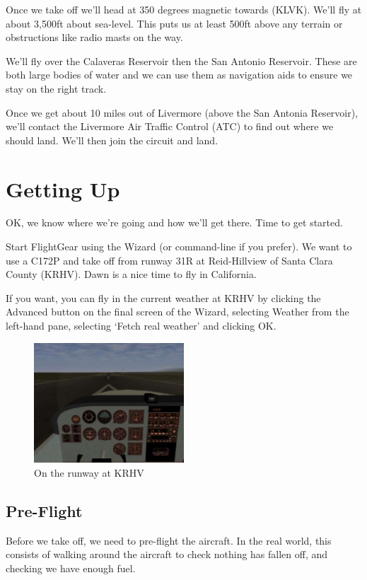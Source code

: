 Once we take off we'll head at 350 degrees magnetic towards  (KLVK).
We'll fly at about 3,500ft about sea-level. This puts us at least 500ft above any
terrain or obstructions like radio masts on the way.

We'll fly over the Calaveras Reservoir then the San Antonio Reservoir. These are
both large bodies of water and we can use them as navigation aids to ensure we
stay on the right track.

Once we get about 10 miles out of Livermore (above the San Antonia Reservoir),
we'll contact the Livermore Air Traffic Control (ATC) to find out
where we should land. We'll then join the circuit and land.

\section{Getting Up}

OK, we know where we're going and how we'll get there. Time to get started.

Start FlightGear using the Wizard (or command-line if you prefer).
 We want to use a C172P and take off from runway 31R at Reid-Hillview of
 Santa Clara County (KRHV). Dawn is a nice time to fly in California.

If you want, you can fly in the current weather at KRHV by clicking the
Advanced button on the final screen of the Wizard, selecting Weather
from the left-hand pane, selecting `Fetch real weather' and clicking OK.

\begin{figure}[!htp]
\centering
\includegraphics[width=0.5\textwidth]{krhvrunway}
\caption{On the runway at KRHV}
\end{figure}

\subsection{Pre-Flight}

Before we take off, we need to pre-flight the aircraft. In the real world,
this consists of walking around the aircraft to check nothing has fallen
off, and checking we have enough fuel.

